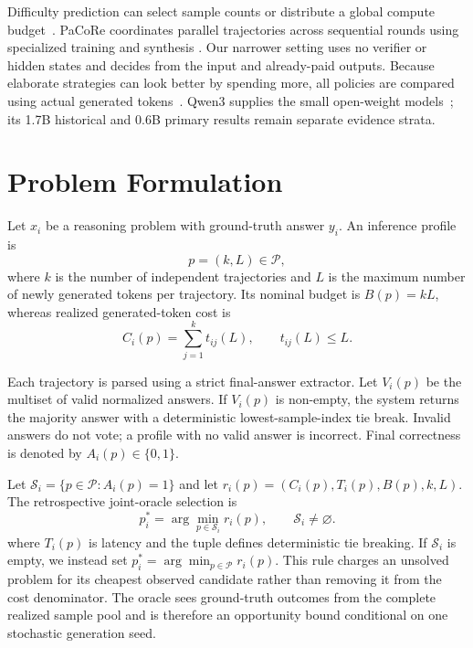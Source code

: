 \documentclass[runningheads]{llncs}
\begin{document}
Difficulty prediction can select sample counts or distribute a global compute
budget~\cite{wang2025penny,zhai2026adaptive}. PaCoRe coordinates parallel
trajectories across sequential rounds using specialized training and synthesis
\cite{hu2026pacore}. Our narrower setting uses no verifier or hidden states and
decides from the input and already-paid outputs. Because elaborate strategies
can look better by spending more, all policies are compared using actual
generated tokens~\cite{wang2024tokeneconomies}. Qwen3 supplies the small
open-weight models~\cite{qwen3report}; its 1.7B historical and 0.6B primary
results remain separate evidence strata.

\section{Problem Formulation}

Let $x_i$ be a reasoning problem with ground-truth answer $y_i$. An inference
profile is
\begin{equation}
  p=(k,L)\in\mathcal{P},
\end{equation}
where $k$ is the number of independent trajectories and $L$ is the maximum
number of newly generated tokens per trajectory. Its nominal budget is
$B(p)=kL$, whereas realized generated-token cost is
\begin{equation}
  C_i(p)=\sum_{j=1}^{k} t_{ij}(L), \qquad t_{ij}(L)\leq L.
\end{equation}

Each trajectory is parsed using a strict final-answer extractor. Let $V_i(p)$
be the multiset of valid normalized answers. If $V_i(p)$ is non-empty, the
system returns the majority answer with a deterministic lowest-sample-index
tie break. Invalid answers do not vote; a profile with no valid answer is
incorrect. Final correctness is denoted by $A_i(p)\in\{0,1\}$.

Let $\mathcal{S}_i=\{p\in\mathcal{P}:A_i(p)=1\}$ and let
$r_i(p)=(C_i(p),T_i(p),B(p),k,L)$. The retrospective joint-oracle selection is
\begin{equation}
  p_i^{*}=\arg\min_{p\in\mathcal{S}_i} r_i(p),
  \qquad \mathcal{S}_i\neq\varnothing.
\end{equation}
where $T_i(p)$ is latency and the tuple defines deterministic tie breaking.
If $\mathcal{S}_i$ is empty, we instead set
$p_i^{*}=\arg\min_{p\in\mathcal{P}}r_i(p)$. This rule charges an unsolved
problem for its cheapest observed candidate rather than removing it from the
cost denominator. The oracle sees
ground-truth outcomes from the complete realized sample pool and is therefore
an opportunity bound conditional on one stochastic generation seed.
\end{document}
